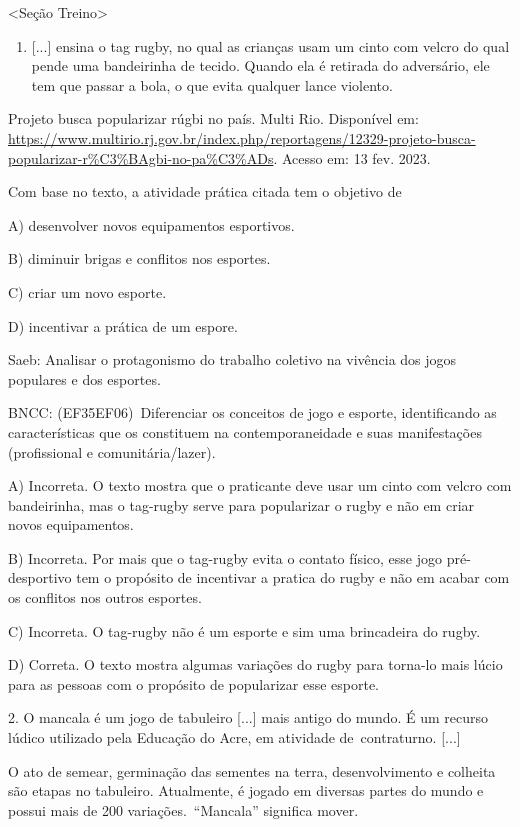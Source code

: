\textless{}Seção Treino\textgreater{}

\begin{enumerate}
\def\labelenumi{\arabic{enumi}.}
\item
  {[}...{]} ensina o tag rugby, no qual as crianças usam um cinto com
  velcro do qual pende uma bandeirinha de tecido. Quando ela é retirada
  do adversário, ele tem que passar a bola, o que evita qualquer lance
  violento.
\end{enumerate}

Projeto busca popularizar rúgbi no país. Multi Rio. Disponível em:
\url{https://www.multirio.rj.gov.br/index.php/reportagens/12329-projeto-busca-popularizar-r\%C3\%BAgbi-no-pa\%C3\%ADs}.
Acesso em: 13 fev. 2023.

Com base no texto, a atividade prática citada tem o objetivo de

A) desenvolver novos equipamentos esportivos.

B) diminuir brigas e conflitos nos esportes.

C) criar um novo esporte.

D) incentivar a prática de um espore.

Saeb: Analisar o protagonismo do trabalho coletivo na vivência dos jogos
populares e dos esportes.

BNCC: (EF35EF06)~Diferenciar os conceitos de jogo e esporte,
identificando as características que os constituem na contemporaneidade
e suas manifestações (profissional e comunitária/lazer).

A) Incorreta. O texto mostra que o praticante deve usar um cinto com
velcro com bandeirinha, mas o tag-rugby serve para popularizar o rugby e
não em criar novos equipamentos.

B) Incorreta. Por mais que o tag-rugby evita o contato físico, esse jogo
pré-desportivo tem o propósito de incentivar a pratica do rugby e não em
acabar com os conflitos nos outros esportes.

C) Incorreta. O tag-rugby não é um esporte e sim uma brincadeira do
rugby.

D) Correta. O texto mostra algumas variações do rugby para torna-lo mais
lúcio para as pessoas com o propósito de popularizar esse esporte.

2. O mancala é um jogo de tabuleiro {[}...{]} mais antigo do mundo. É um
recurso lúdico utilizado pela Educação do Acre, em atividade
de~contraturno. {[}...{]}

O ato de semear, germinação das sementes na terra, desenvolvimento e
colheita são etapas no tabuleiro. Atualmente, é jogado em diversas
partes do mundo e possui mais de 200 variações.~``Mancala'' significa
mover.

